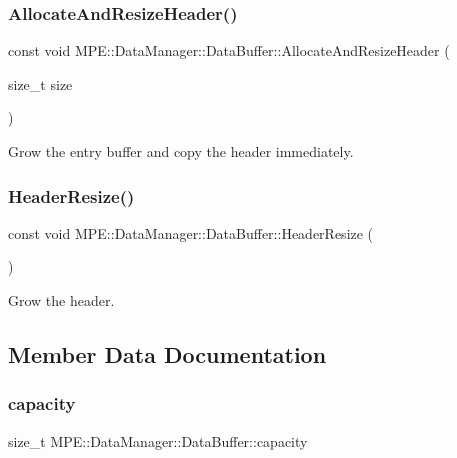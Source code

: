 \subsubsection{\texorpdfstring{Allocate\+And\+Resize\+Header()}{AllocateAndResizeHeader()}}
{\footnotesize\ttfamily const void M\+P\+E\+::\+Data\+Manager\+::\+Data\+Buffer\+::\+Allocate\+And\+Resize\+Header (\begin{DoxyParamCaption}\item[{size\+\_\+t}]{size }\end{DoxyParamCaption})}



Grow the entry buffer and copy the header immediately. 

\mbox{\label{struct_m_p_e_1_1_data_manager_1_1_data_buffer_aa0c025d4f28747a2168748f8a492928f}} 
\subsubsection{\texorpdfstring{Header\+Resize()}{HeaderResize()}}
{\footnotesize\ttfamily const void M\+P\+E\+::\+Data\+Manager\+::\+Data\+Buffer\+::\+Header\+Resize (\begin{DoxyParamCaption}{ }\end{DoxyParamCaption})}



Grow the header. 



\subsection{Member Data Documentation}
\mbox{\label{struct_m_p_e_1_1_data_manager_1_1_data_buffer_ae239cb6309b020933fb4d158e7237a66}} 
\subsubsection{\texorpdfstring{capacity}{capacity}}
{\footnotesize\ttfamily size\+\_\+t M\+P\+E\+::\+Data\+Manager\+::\+Data\+Buffer\+::capacity}


